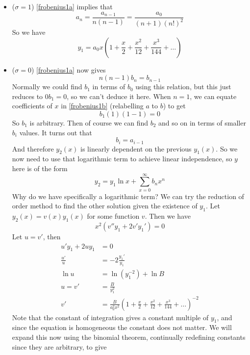 \documentclass{article}
\begin{document}
\begin{itemize}
    \item ($\sigma = 1$) \eqref{frobenius1a} implies that
          \[ a_n = \frac{a_{n-1}}{n(n-1)} = \frac{a_0}{(n+1)(n!)^2} \]
          So we have
          \[ y_1 = a_0x\left(1 + \frac{x}{2} + \frac{x^2}{12} + \frac{x^3}{144} + \dots\right) \]
    \item ($\sigma = 0$) \eqref{frobenius1a} now gives
          \[ n(n-1)b_n = b_{n-1} \]
          Normally we could find $b_1$ in terms of $b_0$ using this relation, but this just reduces to $0b_1 = 0$, so we can't deduce it here. When $n=1$, we can equate coefficients of $x$ in \eqref{frobenius1b} (relabelling $a$ to $b$) to get
          \[ b_1 (1)(1-1) = 0 \]
          So $b_1$ is arbitrary. Then of course we can find $b_2$ and so on in terms of smaller $b_i$ values. It turns out that
          \[ b_i = a_{i-1} \]
          And therefore $y_2(x)$ is linearly dependent on the previous $y_1(x)$. So we now need to use that logarithmic term to achieve linear independence, so $y$ here is of the form
          \[ y_2 = y_1\ln x + \sum_{x=0}^\infty b_nx^n \]
          Why do we have specifically a logarithmic term? We can try the reduction of order method to find the other solution given the existence of $y_1$. Let $y_2(x) = v(x)y_1(x)$ for some function $v$. Then we have
          \[ x^2(v''y_1 + 2v'y_1') = 0 \]
          Let $u=v'$, then
          \begin{align*}
              u'y_1 + 2uy_1 & = 0                                                                                                  \\
              \frac{u'}{u}  & = -2\frac{y_1'}{y_1}                                                                                 \\
              \ln u         & = \ln(y_1^{-2}) + \ln B                                                                              \\
              u = v'        & = \frac{B}{y_1^2}                                                                                    \\
              v'            & = \frac{B}{a_0^2 x^2} \left( 1 + \frac{x}{2} + \frac{x^2}{12} + \frac{x^3}{144} + \dots \right)^{-2}
          \end{align*}
          Note that the constant of integration gives a constant multiple of $y_1$, and since the equation is homogeneous the constant does not matter. We will expand this now using the binomial theorem, continually redefining constants since they are arbitrary, to give

\end{itemize}
\end{document}
